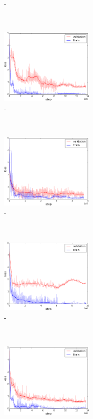 \begin{figure}[t]
\begin{subfigure}[t]{0.33\textwidth}
        \caption{\label{fig:m2f1}\mtwo-\fone}
    \end{subfigure}%
    ~
    \begin{subfigure}[t]{0.33\textwidth}
        \centering
        \includegraphics[height=3.6cm]{03-part-02/chapter-04/figs_and_tables/loss_step_plots/step_m2f2.png}
        \caption{\label{fig:m2f2}\mtwo-\ftwo}
    \end{subfigure}%
    ~
    \begin{subfigure}[t]{0.33\textwidth}
        \centering
        \includegraphics[height=3.6cm]{03-part-02/chapter-04/figs_and_tables/loss_step_plots/step_m2f3.png}
        \caption{\label{fig:m2f3}\mtwo-\fthree}
    \end{subfigure}%
        \\
    \begin{subfigure}[t]{0.33\textwidth}
        \centering
        \includegraphics[height=3.6cm]{03-part-02/chapter-04/figs_and_tables/loss_step_plots/step_m3f1.png}
        \caption{\label{fig:m3f1}\mthree-\fone}
    \end{subfigure}%
    ~
    \begin{subfigure}[t]{0.33\textwidth}
        \centering
        \includegraphics[height=3.6cm]{03-part-02/chapter-04/figs_and_tables/loss_step_plots/step_m3f2.png}

\end{subfigure}
\end{figure}
